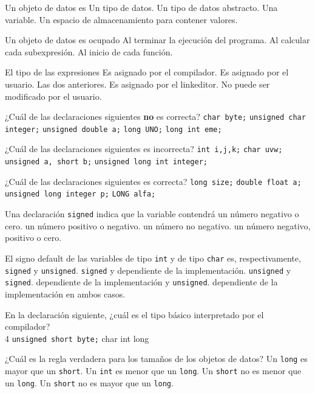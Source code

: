 
\question Un objeto de datos es
\choice Un tipo de datos.
\choice Un tipo de datos abstracto.
\choice Una variable.
\correctchoice Un espacio de almacenamiento para contener valores.

\question Un objeto de datos es ocupado
\choice Al terminar la ejecución del programa.
\correctchoice Al calcular cada subexpresión.
\choice Al inicio de cada función.

\question El tipo de las expresiones
\choice Es asignado por el compilador.
\choice Es asignado por el usuario.
\correctchoice Las dos anteriores.
\choice Es asignado por el linkeditor.
\choice No puede ser modificado por el usuario.

\question ¿Cuál de las declaraciones siguientes \textbf{no} es correcta?
\choice \texttt{char byte;}
\choice \texttt{unsigned char integer;}
\correctchoice \texttt{unsigned double a;}
\choice \texttt{long UNO;}
\choice \texttt{long int eme;}

\question ¿Cuál de las declaraciones siguientes es incorrecta?
\choice \texttt{int i,j,k;}
\choice \texttt{char uvw;}
\correctchoice \texttt{unsigned a, short b;}
\choice \texttt{unsigned long int integer;}

\question ¿Cuál de las declaraciones siguientes es correcta?
\correctchoice \texttt{long size;}
\choice \texttt{double float a;}
\choice \texttt{unsigned long integer p;}
\choice \texttt{LONG alfa;}

\question Una declaración \texttt{signed} indica que la variable contendrá
\choice un número negativo o cero.
\choice un número positivo o negativo.
\choice un número no negativo.
\correctchoice un número negativo, positivo o cero.

\question El signo default de las variables de tipo \texttt{int} y de tipo \texttt{char} es, respectivamente,
\choice \texttt{signed} y \texttt{unsigned}.
\correctchoice \texttt{signed} y dependiente de la implementación.
\choice \texttt{unsigned} y \texttt{signed}.
\choice dependiente de la implementación y \texttt{unsigned}.
\choice dependiente de la implementación en ambos casos.

\question En la declaración siguiente, ¿cuál es el tipo básico interpretado por el compilador? \\4
\texttt{unsigned short byte;}
\choice char
\correctchoice int
\choice long

\question ¿Cuál es la regla verdadera para los tamaños de los objetos de datos?
\choice Un \texttt{long} es mayor que un \texttt{short}.
\choice Un \texttt{int} es menor que un \texttt{long}.
\choice Un \texttt{short} no es menor que un \texttt{long}.
\correctchoice Un \texttt{short} no es mayor que un \texttt{long}.

